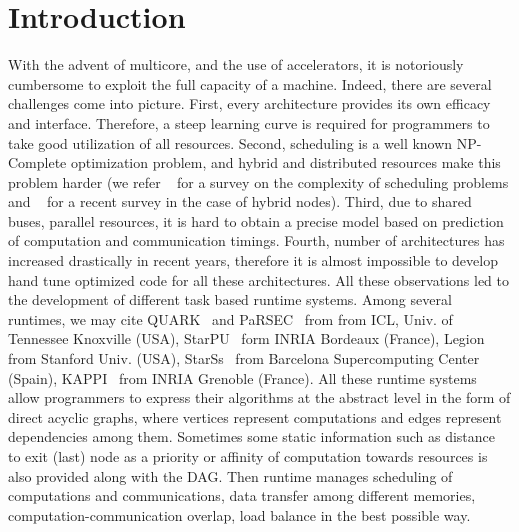 \documentclass[runningheads]{llncs} %
\begin{document}
	
	\section{Introduction} 
			
	With the advent of multicore, and the use of accelerators, it is notoriously cumbersome to exploit the full capacity of a machine. Indeed, there are several challenges come into picture. First, every architecture provides its own efficacy and interface. Therefore, a steep learning curve is required for programmers to take good utilization of all resources. Second, scheduling is a well known NP-Complete optimization problem, and hybrid and distributed resources make this problem harder (we refer ~\cite{webpagescheduling} for a survey on the complexity of scheduling problems and ~\cite{bleuse2015scheduling} for a recent survey in the case of hybrid nodes). Third, due to shared buses, parallel resources, it is hard to obtain a precise model based on prediction of computation and communication timings. Fourth, number of architectures has increased drastically in recent years, therefore it is almost impossible to develop hand tune optimized code for all these architectures. All these observations led to the development of different task based runtime systems. Among several runtimes, we may cite QUARK~\cite{YarKhan:2011:Quark:Manual} and PaRSEC~\cite{parsec} from from ICL, Univ. of Tennessee Knoxville (USA), StarPU~\cite{starpu} form INRIA Bordeaux (France), Legion~\cite{legion12} from Stanford Univ. (USA), StarSs~\cite{ompss} from Barcelona Supercomputing Center (Spain), KAPPI~\cite{kaapi} from INRIA Grenoble (France). All these runtime systems allow programmers to express their algorithms at the abstract level in the form of direct acyclic graphs, where vertices represent computations and edges represent dependencies among them. Sometimes some static information such as distance to exit (last) node as a priority or affinity of computation towards resources is also provided along with the DAG. Then runtime manages scheduling of computations and communications, data transfer among different memories, computation-communication overlap, load balance in the best possible way.  
		
		
\end{document}
